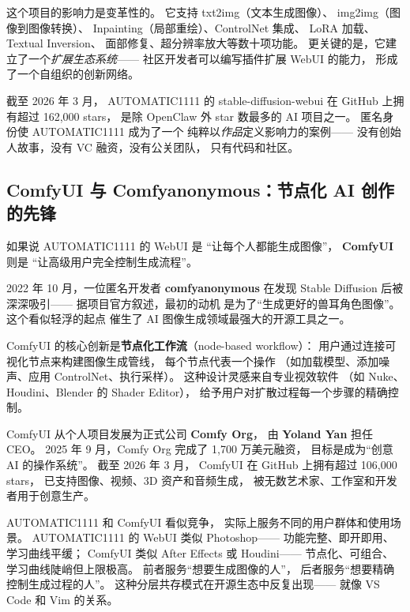 这个项目的影响力是变革性的。
它支持 txt2img（文本生成图像）、
img2img（图像到图像转换）、
Inpainting（局部重绘）、ControlNet 集成、
LoRA 加载、Textual Inversion、
面部修复、超分辨率放大等数十项功能。
更关键的是，它建立了一个\emph{扩展生态系统}——
社区开发者可以编写插件扩展 WebUI 的能力，
形成了一个自组织的创新网络。

截至 2026 年 3 月，
AUTOMATIC1111 的 stable-diffusion-webui
在 GitHub 上拥有超过 162,000 stars，
是除 OpenClaw 外 star 数最多的 AI 项目之一。
匿名身份使 AUTOMATIC1111 成为了一个
纯粹以\emph{作品}定义影响力的案例——
没有创始人故事，没有 VC 融资，没有公关团队，
只有代码和社区。

\subsection{ComfyUI 与 Comfyanonymous：节点化 AI 创作的先锋}

如果说 AUTOMATIC1111 的 WebUI 是
``让每个人都能生成图像''，
\textbf{ComfyUI} 则是
``让高级用户完全控制生成流程''。

2022 年 10 月，一位匿名开发者 \textbf{comfyanonymous}
在发现 Stable Diffusion 后被深深吸引——
据项目官方叙述，最初的动机
是为了``生成更好的兽耳角色图像''。
这个看似轻浮的起点
催生了 AI 图像生成领域最强大的开源工具之一。

ComfyUI 的核心创新是\textbf{节点化工作流}（node-based workflow）：
用户通过连接可视化节点来构建图像生成管线，
每个节点代表一个操作
（如加载模型、添加噪声、应用 ControlNet、执行采样）。
这种设计灵感来自专业视效软件
（如 Nuke、Houdini、Blender 的 Shader Editor），
给予用户对扩散过程每一个步骤的精确控制。

ComfyUI 从个人项目发展为正式公司 \textbf{Comfy Org}，
由 \textbf{Yoland Yan} 担任 CEO。
2025 年 9 月，Comfy Org 完成了 1,700 万美元融资，
目标是成为``创意 AI 的操作系统''。
截至 2026 年 3 月，
ComfyUI 在 GitHub 上拥有超过 106,000 stars，
已支持图像、视频、3D 资产和音频生成，
被无数艺术家、工作室和开发者用于创意生产。

\begin{whybox}
AUTOMATIC1111 和 ComfyUI 看似竞争，
实际上服务不同的用户群体和使用场景。
AUTOMATIC1111 的 WebUI 类似 Photoshop——
功能完整、即开即用、学习曲线平缓；
ComfyUI 类似 After Effects 或 Houdini——
节点化、可组合、学习曲线陡峭但上限极高。
前者服务``想要生成图像的人''，
后者服务``想要精确控制生成过程的人''。
这种分层共存模式在开源生态中反复出现——
就像 VS Code 和 Vim 的关系。
\end{whybox}

